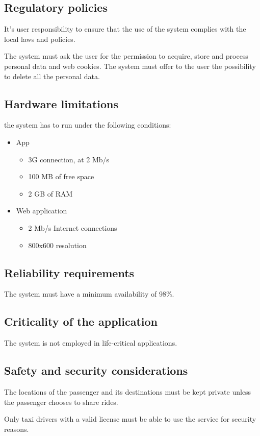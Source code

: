\subsection{Regulatory policies}
It's user responsibility to ensure that the use of the system complies with the local laws and policies.

The system must ask the user for the permission to acquire, store and process personal data and web cookies. The system must offer to the user the possibility to delete all the personal data.

\subsection{Hardware limitations}
the system has to run under the following conditions:
\begin{itemize}
\item App
\begin{itemize}
\item 3G connection, at 2 Mb/s
\item 100 MB of free space
\item 2 GB of RAM
\end{itemize}
\item Web application
\begin{itemize}
\item 2 Mb/s Internet connections
\item 800x600 resolution
\end{itemize}
\end{itemize}

\subsection{Reliability requirements}
The system must have a minimum availability of 98\%.

\subsection{Criticality of the application}
The system is not employed in life-critical applications.

\subsection{Safety and security considerations}
The locations of the passenger and its destinations must be kept private unless the passenger chooses to share rides.

Only taxi drivers with a valid license must be able to use the service for security reasons.
